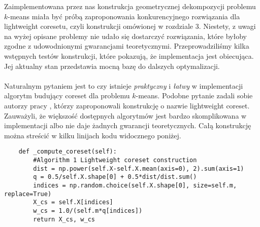 Zaimplementowana przez nas konstrukcja geometrycznej dekompozycji problemu $k$-means miała być próbą zaproponowania konkurencyjnego rozwiązania dla lightweight coresetu, czyli konstrukcji omówionej w rozdziale 3.
Niestety, z uwagi na wyżej opisane problemy nie udało się dostarczyć rozwiązania, które byłoby zgodne z udowodnionymi gwarancjami teoretycznymi.
Przeprowadziliśmy kilka wstępnych testów konstrukcji, które pokazują, że implementacja jest obiecująca.
Jej aktualny stan przedstawia mocną bazę do dalszych optymalizacji.   
\\~\\
Naturalnym pytaniem jest to czy istnieje \textit{praktyczny} i \textit{łatwy} w implementacji algorytm budujący coreset dla problemu $k$-means.
Podobne pytanie zadali sobie autorzy pracy \cite{bachem2017scalable}, którzy zaproponowali konstrukcję o nazwie lightweight coreset.
Zauważyli, że większość dostępnych algorytmów jest bardzo skomplikowana w implementacji albo nie daje żadnych gwarancji teoretycznych.
Całą konstrukcję można streścić w kilku linijach kodu widocznego poniżej.
\\
\lstset{language=Python}
\begin{lstlisting}
    def _compute_coreset(self):
        #Algorithm 1 Lightweight coreset construction
        dist = np.power(self.X-self.X.mean(axis=0), 2).sum(axis=1)
        q = 0.5/self.X.shape[0] + 0.5*dist/dist.sum()
        indices = np.random.choice(self.X.shape[0], size=self.m, replace=True)
        X_cs = self.X[indices]
        w_cs = 1.0/(self.m*q[indices])
        return X_cs, w_cs
\end{lstlisting}